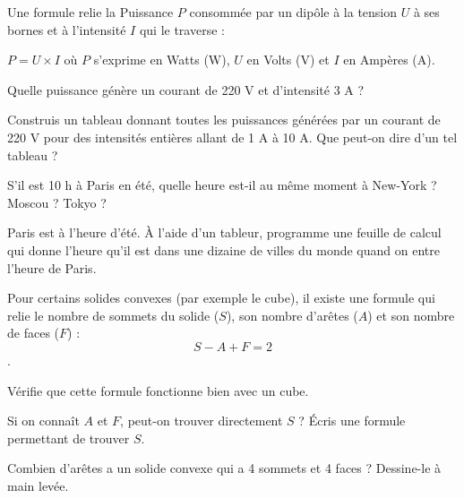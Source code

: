 

\begin{exercice}[En électricité]
Une formule relie la Puissance $P$ consommée par un dipôle à la tension $U$ à ses bornes et à l'intensité $I$ qui le traverse :

$P = U \times I$ où $P$ s'exprime en Watts (W), $U$ en Volts (V) et $I$ en Ampères (A).

\begin{colenumerate}{1} 
\item Quelle puissance génère un courant de 220 V et d'intensité 3 A ?
\item Construis un tableau donnant toutes les puissances générées par un courant de 220 V pour des intensités entières allant de 1 A à 10 A. Que peut-on dire d'un tel tableau ?
\end{colenumerate} 
\end{exercice}

\begin{exercice}

\begin{colenumerate}{1} 
\item S'il est 10 h à Paris en été, quelle heure est-il au même moment à New-York ? Moscou ? Tokyo ?
\item Paris est à l'heure d'été. À l'aide d'un tableur, programme une feuille de calcul qui donne l'heure qu'il est dans une dizaine de villes du monde quand on entre l'heure de Paris. 
\end{colenumerate} 
\end{exercice}



\begin{exercice}

Pour certains solides convexes (par exemple le cube), il existe une formule qui relie le nombre de sommets du solide ($S$), son nombre d'arêtes ($A$) et son nombre de faces ($F$) :
\[ S - A + F = 2 \].

\begin{colenumerate}{1} 
\item Vérifie que cette formule fonctionne bien avec un cube.
\item Si on connaît $A$ et $F$, peut-on trouver directement $S$ ? Écris une formule permettant de trouver $S$.
\item Combien d'arêtes a un solide convexe qui a 4 sommets et 4 faces ? Dessine-le à main levée.
\end{colenumerate} 
 
\end{exercice}




